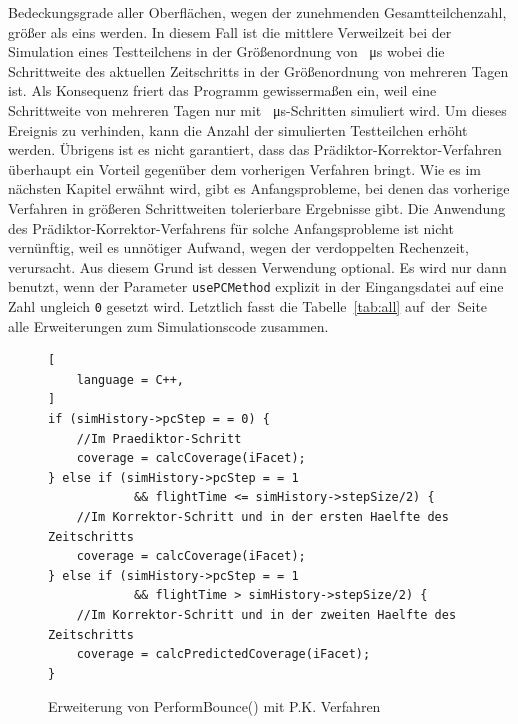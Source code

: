\documentclass{listhesis}
\begin{document}
Bedeckungsgrade aller Oberflächen, wegen der zunehmenden Gesamtteilchenzahl, größer als eins werden. In diesem Fall ist die mittlere Verweilzeit bei der Simulation eines Testteilchens in der Größenordnung von \SI{}{\micro\s} wobei die Schrittweite des aktuellen Zeitschritts in der Größenordnung von mehreren Tagen ist. Als Konsequenz friert das Programm gewissermaßen ein, weil eine Schrittweite von mehreren Tagen nur mit \SI{}{\micro\s}-Schritten simuliert wird. Um dieses Ereignis zu verhinden, kann die Anzahl der simulierten Testteilchen erhöht werden. Übrigens ist es nicht garantiert, dass das Prädiktor-Korrektor-Verfahren überhaupt ein Vorteil gegenüber dem vorherigen Verfahren bringt. Wie es im nächsten Kapitel erwähnt wird, gibt es Anfangsprobleme, bei denen das vorherige Verfahren in größeren Schrittweiten tolerierbare Ergebnisse gibt. Die Anwendung des Prädiktor-Korrektor-Verfahrens für solche Anfangsprobleme ist nicht vernünftig, weil es unnötiger Aufwand, wegen der verdoppelten Rechenzeit, verursacht. Aus diesem Grund ist dessen Verwendung optional. Es wird nur dann benutzt, wenn der Parameter \texttt{usePCMethod} explizit in der Eingangsdatei auf eine Zahl ungleich \texttt{0} gesetzt wird. Letztlich fasst die Tabelle~\ref{tab:all} auf~der~Seite~\pageref{tab:all} alle Erweiterungen zum Simulationscode zusammen.


\begin{figure}[!p]
\centering
\begin{lstlisting}[
    language = C++,
]
if (simHistory->pcStep = = 0) { 
	//Im Praediktor-Schritt
	coverage = calcCoverage(iFacet);
} else if (simHistory->pcStep = = 1 
		    && flightTime <= simHistory->stepSize/2) { 
	//Im Korrektor-Schritt und in der ersten Haelfte des Zeitschritts
	coverage = calcCoverage(iFacet);
} else if (simHistory->pcStep = = 1 
		    && flightTime > simHistory->stepSize/2) {
	//Im Korrektor-Schritt und in der zweiten Haelfte des Zeitschritts
	coverage = calcPredictedCoverage(iFacet);			
}
\end{lstlisting}
\caption{Erweiterung von PerformBounce() mit P.K. Verfahren}
\label{fig:performBounce}
\end{figure}
\end{document}
